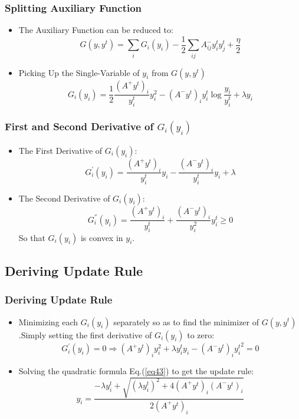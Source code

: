 \documentclass{beamer}
\begin{document}
\begin{frame}\frametitle{Splitting Auxiliary Function}
\begin{itemize}
\item The Auxiliary Function can be reduced to:
\begin{equation}\label{eq39}
G(y,y^t)=\sum_i G_i(y_i)-\frac{1}{2}\sum_{ij}A_{ij}^-y_i^ty_j^t+\frac{\eta}{2}
\end{equation}
\item Picking Up the Single-Variable of $y_i$ from $G(y,y^t)$
\begin{equation}\label{eq40}
G_i(y_i)=\frac{1}{2}\frac{(A^+y^t)_i}{y_i^t}y_i^2-(A^-y^t)_iy_i^t\log\frac{y_i}{y_i^t}+\lambda y_i
\end{equation}
\end{itemize}
\end{frame}


\begin{frame}\frametitle{First and Second Derivative of $G_i(y_i)$}
\begin{itemize}
\item The First Derivative of $G_i(y_i)$:
\begin{equation}\label{eq41}
G_i^{'}(y_i)=\frac{(A^+y^t)_i}{y_i^t}y_i-\frac{(A^-y^t)_i}{y_i^t}y_i+\lambda
\end{equation}
\item The Second Derivative of $G_i(y_i)$:
\begin{equation}\label{eq42}
G_i^{''}(y_i)=\frac{(A^+y^t)_i}{y_i^t}+\frac{(A^-y^t)_i}{y_i^2}y_i^t\geq 0
\end{equation}
So that $G_i(y_i)$ is convex in $y_i$.
\end{itemize}
\end{frame}


\subsection{Deriving Update Rule}
\begin{frame}\frametitle{Deriving Update Rule}
\begin{itemize}
\item Minimizing each $G_i(y_i)$ separately so as to find the minimizer of $G(y,y^t)$.Simply setting the first derivative of $G_i(y_i)$ to zero:
\begin{equation}\label{eq43}
G_i^{'}(y_i)=0\Longrightarrow(A^+y^t)_iy_i^2+\lambda y_i^ty_i-(A^-y^t)_i{y_i^t}^2=0
\end{equation}
\item Solving the quadratic formula Eq.(\ref{eq43}) to get the update rule:
\begin{equation}\label{eq44}
y_i=\frac{-\lambda y_i^t+\sqrt{(\lambda y_i^t)^2+4(A^+y^t)_i(A^-y^t)_i}}{2(A^+y^t)_i}
\end{equation}
\end{itemize}
\end{frame}
\end{document}
